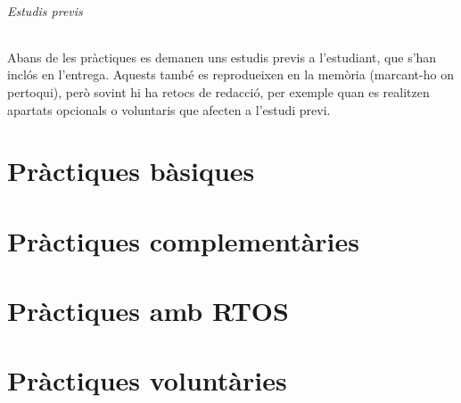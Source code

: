 \documentclass[catalan,parskip=half*,oneside,DIV=11,hidelinks]{scrreprt}
\begin{document}
\paragraph{Estudis previs}

Abans de les pràctiques es demanen uns estudis previs a l'estudiant, que s'han inclós en l'entrega.
Aquests també es reprodueixen en la memòria (marcant-ho on pertoqui), però sovint hi ha retocs
de redacció, per exemple quan es realitzen apartats opcionals o voluntaris que afecten a l'estudi
previ.


\newcommand{\projectname}{}
\newcommand{\inputproject}[1]{
  \renewcommand{\projectname}{#1}
  
}
\newcommand{\projectstart}[3]{ \chapter{Pràctica #2 -- #3} \label{ch:#1} }

\part{Pràctiques bàsiques} \label{part:p-p}
\inputproject{P1}
\inputproject{P2}
\inputproject{P3}
\inputproject{P4}

\part{Pràctiques complementàries} \label{part:p-c}
\inputproject{C1}
\inputproject{C2}
\inputproject{C3}

\part{Pràctiques amb RTOS} \label{part:p-r}
\inputproject{R1}
\inputproject{R2}

\part{Pràctiques voluntàries} \label{part:p-v}
\inputproject{selector}
\inputproject{basecvt}

\end{document}
